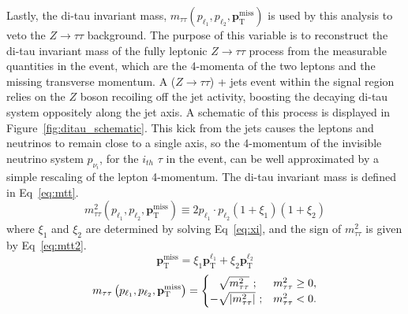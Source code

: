 Lastly, the di-tau invariant mass, $m_{\tau\tau}\left(p_{\ell_1}, p_{\ell_2}, \mathbf{p}_\mathrm{T}^\mathrm{miss}\right) $ is used by this analysis to veto the $Z\rightarrow\tau\tau$ background.   The purpose of this variable is to reconstruct the di-tau invariant mass of the fully leptonic $Z\rightarrow\tau\tau$ process from the measurable quantities in the event, which are the 4-momenta of the two leptons and the missing transverse momentum.  A ($Z\rightarrow\tau\tau$) + jets event within the signal region relies on the $Z$ boson recoiling off the jet activity, boosting the decaying di-tau system oppositely along the jet axis.  A schematic of this process is displayed in Figure~\ref{fig:ditau_schematic}.  This kick from the jets causes the leptons and neutrinos to remain close to a single axis, so the 4-momentum of the invisible neutrino system $p_{\nu_i}$, for the $i_{th}$ $\tau$ in the event, can be well approximated by a simple rescaling of the lepton 4-momentum. The di-tau invariant mass is defined in Eq~\ref{eq:mtt}.
 \begin{equation}
 \label{eq:mtt}
 m^2_{\tau\tau}\left(p_{\ell_1}, p_{\ell_2}, \mathbf{p}_\mathrm{T}^\mathrm{miss}\right) \equiv 2p_{\ell_1}\cdot p_{\ell_2}(1+\xi_1)(1+\xi_2)
 \end{equation}
 where $\xi_1$ and $\xi_2$ are determined by solving Eq~\ref{eq:xi}, and the sign of $m^2_{\tau\tau}$ is given by Eq~\ref{eq:mtt2}.
  \begin{equation}
   \label{eq:xi}
  \mathbf{p}_\mathrm{T}^\mathrm{miss} = \xi_1\mathbf{p}_\mathrm{T}^\mathrm{\ell_1}+\xi_2\mathbf{p}_\mathrm{T}^\mathrm{\ell_2}
   \end{equation}
 \begin{equation}
 \label{eq:mtt2}
 m_{\tau\tau}\left(p_{\ell_1}, p_{\ell_2}, \mathbf{p}_\mathrm{T}^\mathrm{miss}\right) =
\begin{cases}
\hphantom{-}\sqrt{m_{\tau\tau}^2}~;               & m_{\tau\tau}^2 \geq 0,\\
 -\sqrt{\left| m_{\tau\tau}^2\right|}~; & m_{\tau\tau}^2 < 0.
\end{cases} 
 \end{equation} 
  
